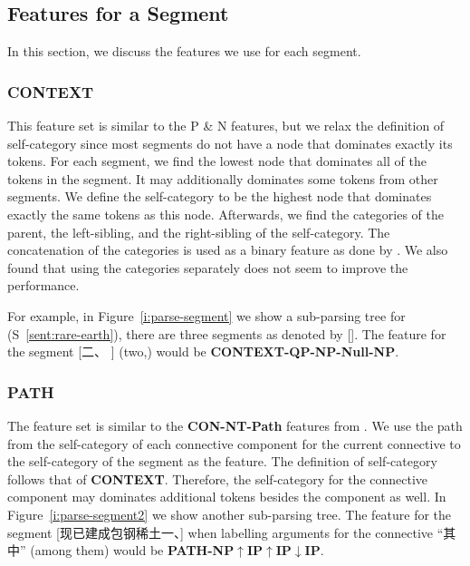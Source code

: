 \subsection{Features for a Segment}

In this section, we discuss the features we use for each segment.

\subsubsection{CONTEXT}

This feature set is similar to the P \& N features, but we relax the
definition of self-category since most segments do not have a node that
dominates exactly its tokens. For each segment, we find the lowest node
that dominates all of the tokens in the segment. It may additionally
dominates some tokens from other segments. We define the self-category
to be the highest node that dominates exactly the same tokens as this node.
Afterwards, we find the categories of the parent, the left-sibling, and
the right-sibling of the self-category. The concatenation of the categories is
used as a binary feature as done by \cite{kong2014a}. We also found that
using the categories separately does not seem to improve the performance.

For example, in Figure~\ref{i:parse-segment} we show a sub-parsing tree for
(S~\ref{sent:rare-earth}), there are three segments as denoted by [].
The feature for the segment [二、 ] (two,) would be
\textbf{CONTEXT-QP-NP-Null-NP}.



\subsubsection{PATH}

The feature set is similar to the \textbf{CON-NT-Path} features
from \cite{kong2014a}.
We use the path from the self-category of each connective component for the
current connective to the self-category of the segment as the feature. The
definition of self-category follows that of \textbf{CONTEXT}. Therefore,
the self-category for the connective component may dominates additional tokens
besides the component as well.
In Figure~\ref{i:parse-segment2} we show another sub-parsing tree.
The feature for the segment [现已建成包钢稀土一、] when labelling arguments
for the connective ``其中'' (among them) would be
\textbf{PATH-NP$\uparrow$IP$\uparrow$IP$\downarrow$IP}.

